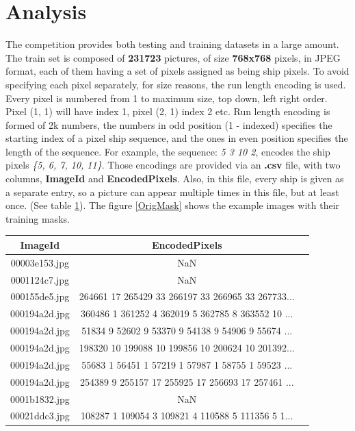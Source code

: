 \section{Analysis}
The competition provides both testing and training datasets in a large amount. The train set is composed of \textbf{231723} pictures, of size \textbf{768x768} pixels, in JPEG format, each of them having a set of pixels assigned as being ship pixels. To avoid specifying each pixel separately, for size reasons, the run length encoding is used. Every pixel is numbered from 1 to maximum size, top down, left right order. Pixel (1, 1) will have index 1, pixel (2, 1) index 2 etc. Run length encoding is formed of 2k numbers, the numbers in odd position (1 - indexed) specifies the starting index of a pixel ship sequence, and the ones in even position specifies the length of the sequence.
For example, the sequence: \textit{5 3 10 2}, encodes the ship pixels \textit{\{5, 6, 7, 10, 11\}}. Those encodings are provided via an \textbf{.csv} file, with two columns, \textbf{ImageId} and \textbf{EncodedPixels}. Also, in this file, every ship is given as a separate entry, so a picture can appear multiple times in this file, but at least once. (See table \ref{traindfhead}). The figure \ref{OrigMask} shows the example images with their training masks.\\

\begin{table}[H]
	\centering
	\begin{tabular}{|c|c|l|}
		\hline
		ImageId & EncodedPixels \\ \hline
		00003e153.jpg & NaN         \\ \hline
		0001124c7.jpg & NaN         \\ \hline
		000155de5.jpg & 264661 17 265429 33 266197 33 266965 33 267733...         \\ \hline
		000194a2d.jpg & 360486 1 361252 4 362019 5 362785 8 363552 10 ...   \\ \hline
		000194a2d.jpg & 51834 9 52602 9 53370 9 54138 9 54906 9 55674 ...   \\ \hline
		000194a2d.jpg & 198320 10 199088 10 199856 10 200624 10 201392...  \\ \hline
		000194a2d.jpg & 55683 1 56451 1 57219 1 57987 1 58755 1 59523 ...  \\ \hline
		000194a2d.jpg & 254389 9 255157 17 255925 17 256693 17 257461 ...  \\ \hline
		0001b1832.jpg & NaN  \\ \hline
		00021ddc3.jpg & 108287 1 109054 3 109821 4 110588 5 111356 5 1...  \\ \hline
	\end{tabular}
	\label{traindfhead}
\end{table}

